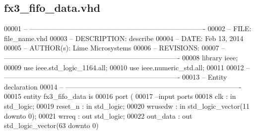 \subsection{fx3\+\_\+fifo\+\_\+data.\+vhd}
\label{fx3__fifo__data_8vhd_source}

\begin{DoxyCode}
00001 \textcolor{keyword}{-- ---------------------------------------------------------------------------- }
00002 \textcolor{keyword}{-- FILE:    file\_name.vhd}
00003 \textcolor{keyword}{-- DESCRIPTION: describe}
00004 \textcolor{keyword}{-- DATE:    Feb 13, 2014}
00005 \textcolor{keyword}{-- AUTHOR(s):   Lime Microsystems}
00006 \textcolor{keyword}{-- REVISIONS:}
00007 \textcolor{keyword}{-- ---------------------------------------------------------------------------- }
00008 \textcolor{vhdlkeyword}{library }\textcolor{keywordflow}{ieee};
00009 \textcolor{vhdlkeyword}{use }ieee.std\_logic\_1164.\textcolor{keywordflow}{all};
00010 \textcolor{vhdlkeyword}{use }ieee.numeric\_std.\textcolor{keywordflow}{all};
00011 
00012 \textcolor{keyword}{-- ----------------------------------------------------------------------------}
00013 \textcolor{keyword}{-- Entity declaration}
00014 \textcolor{keyword}{-- ----------------------------------------------------------------------------}
00015 \textcolor{keywordflow}{entity }fx3_fifo_data \textcolor{keywordflow}{is}
00016   \textcolor{keywordflow}{port} \textcolor{vhdlchar}{(}
00017 \textcolor{keyword}{        --input ports }
00018         \textcolor{vhdlchar}{clk}       \textcolor{vhdlchar}{:} \textcolor{keywordflow}{in} \textcolor{comment}{std\_logic};
00019         \textcolor{vhdlchar}{reset_n}   \textcolor{vhdlchar}{:} \textcolor{keywordflow}{in} \textcolor{comment}{std\_logic};
00020           \textcolor{vhdlchar}{wrusedw}   \textcolor{vhdlchar}{:} \textcolor{keywordflow}{in} \textcolor{comment}{std\_logic\_vector}\textcolor{vhdlchar}{(}\textcolor{vhdllogic}{}\textcolor{vhdllogic}{11} \textcolor{keywordflow}{downto} \textcolor{vhdllogic}{}\textcolor{vhdllogic}{0}\textcolor{vhdlchar}{)};
00021           \textcolor{vhdlchar}{wrreq}     \textcolor{vhdlchar}{:} \textcolor{keywordflow}{out} \textcolor{comment}{std\_logic};
00022           \textcolor{vhdlchar}{out_data}  \textcolor{vhdlchar}{:} \textcolor{keywordflow}{out} \textcolor{comment}{std\_logic\_vector}\textcolor{vhdlchar}{(}\textcolor{vhdllogic}{}\textcolor{vhdllogic}{63} \textcolor{keywordflow}{downto} \textcolor{vhdllogic}{}\textcolor{vhdllogic}{0}\textcolor{vhdlchar}{)}

\end{DoxyCode}
